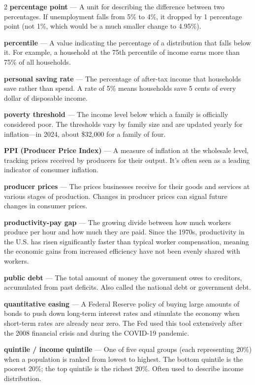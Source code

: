 \begin{multicols}{2}
\textbf{percentage point} --- A unit for describing the difference between two percentages. If unemployment falls from 5\% to 4\%, it dropped by 1 percentage point (not 1\%, which would be a much smaller change to 4.95\%).

\textbf{percentile} --- A value indicating the percentage of a distribution that falls below it. For example, a household at the 75th percentile of income earns more than 75\% of all households.

\textbf{personal saving rate} --- The percentage of after-tax income that households save rather than spend. A rate of 5\% means households save 5 cents of every dollar of disposable income.

\textbf{poverty threshold} --- The income level below which a family is officially considered poor. The thresholds vary by family size and are updated yearly for inflation---in 2024, about \$32,000 for a family of four.

\textbf{PPI (Producer Price Index)} --- A measure of inflation at the wholesale level, tracking prices received by producers for their output. It's often seen as a leading indicator of consumer inflation.

\textbf{producer prices} --- The prices businesses receive for their goods and services at various stages of production. Changes in producer prices can signal future changes in consumer prices.

\textbf{productivity-pay gap} --- The growing divide between how much workers produce per hour and how much they are paid. Since the 1970s, productivity in the U.S. has risen significantly faster than typical worker compensation, meaning the economic gains from increased efficiency have not been evenly shared with workers.

\textbf{public debt} --- The total amount of money the government owes to creditors, accumulated from past deficits. Also called the national debt or government debt.

\textbf{quantitative easing} --- A Federal Reserve policy of buying large amounts of bonds to push down long-term interest rates and stimulate the economy when short-term rates are already near zero. The Fed used this tool extensively after the 2008 financial crisis and during the COVID-19 pandemic.

\textbf{quintile / income quintile} --- One of five equal groups (each representing 20\%) when a population is ranked from lowest to highest. The bottom quintile is the poorest 20\%; the top quintile is the richest 20\%. Often used to describe income distribution.


\end{multicols}
